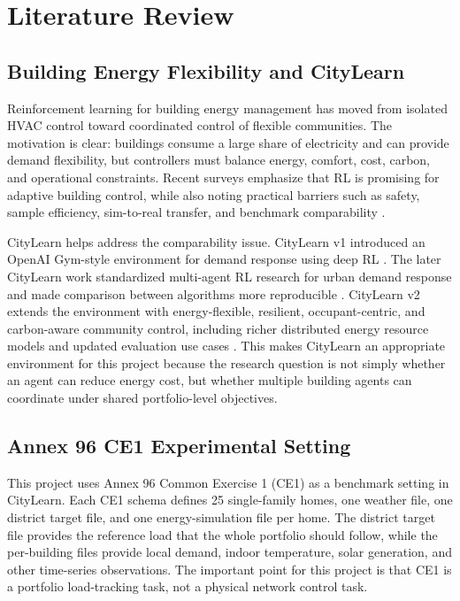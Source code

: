﻿\chapter{Literature Review}\label{ch:background}

\section{Building Energy Flexibility and CityLearn}

Reinforcement learning for building energy management has moved from isolated
HVAC control toward coordinated control of flexible communities. The motivation
is clear: buildings consume a large share of electricity and can provide demand
flexibility, but controllers must balance energy, comfort, cost, carbon, and
operational constraints. Recent surveys emphasize that RL is promising for
adaptive building control, while also noting practical barriers such as safety,
sample efficiency, sim-to-real transfer, and benchmark comparability
\cite{zandi2023tenquestions,safeDRL2025}.

CityLearn helps address the comparability issue. CityLearn v1 introduced an
OpenAI Gym-style environment for demand response using deep RL
\cite{citylearn2019}. The later CityLearn work standardized multi-agent RL
research for urban demand response and made comparison between algorithms more
reproducible \cite{citylearn2020}. CityLearn v2 extends the environment with
energy-flexible, resilient, occupant-centric, and carbon-aware community
control, including richer distributed energy resource models and updated
evaluation use cases \cite{citylearnv2}. This makes CityLearn an appropriate
environment for this project because the research question is not simply
whether an agent can reduce energy cost, but whether multiple building agents
can coordinate under shared portfolio-level objectives.

\section{Annex 96 CE1 Experimental Setting}

This project uses Annex 96 Common Exercise 1 (CE1) as a benchmark setting in
CityLearn. Each CE1 schema defines 25 single-family homes, one weather file, one
district target file, and one energy-simulation file per home. The district
target file provides the reference load that the whole portfolio should follow,
while the per-building files provide local demand, indoor temperature, solar
generation, and other time-series observations. The important point for this
project is that CE1 is a portfolio load-tracking task, not a physical network
control task.

